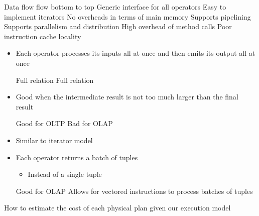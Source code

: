 \begin{itemize}
\begin{itemize}
\begin{itemize}
\begin{itemize}
                        \end{itemize}
                     Data flow flow bottom to top
                    \ipro Generic interface for all operators
                    \ipro Easy to implement iterators
                    \ipro No overheads in terms of main memory
                    \ipro Supports pipelining
                    \ipro Supports parallelism and distribution
                    \icon High overhead of method calls
                    \icon Poor instruction cache locality
                \end{itemize}
                \begin{itemize}
                    \item Each operator processes its inputs all at once and then emits its output all at once
                        \begin{itemize}
                             Full relation
                             Full relation
                        \end{itemize}
                    \item Good when the intermediate result is not too much larger than the final result
                        \begin{itemize}
                            \ipro Good for OLTP
                            \icon Bad for OLAP
                        \end{itemize}
                \end{itemize}
                \begin{itemize}
                    \item Similar to iterator model
                    \item Each operator returns a batch of tuples
                        \begin{itemize}
                            \item Instead of a single tuple
                        \end{itemize}
                    \ipro Good for OLAP
                    \ipro Allows for vectored instructions to process batches of tuples
                \end{itemize}
        \end{itemize}
     How to estimate the cost of each physical plan given our execution model
        \begin{itemize}

\end{itemize}
\end{itemize}
